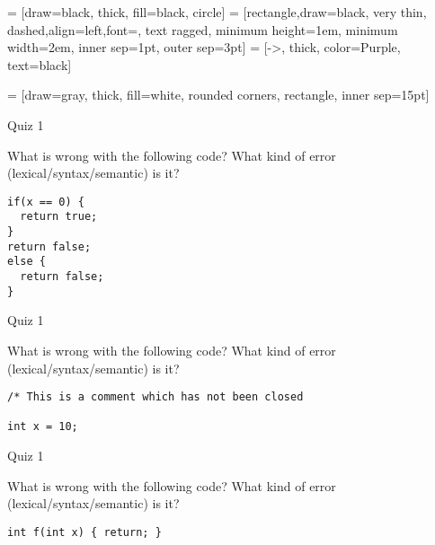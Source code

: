 \documentclass{beamer}
\begin{document}
 = [draw=black, thick, fill=black, circle]
 = [rectangle,draw=black, very thin, dashed,align=left,font=\scriptsize, text ragged, minimum height=1em, minimum width=2em, inner sep=1pt, outer sep=3pt]
 = [->, thick, color=Purple, text=black]



\newcommand\Mstrut[1]{\rule{0pt}{#1cm}}


 = [draw=gray, thick, fill=white, rounded corners, rectangle, inner sep=15pt]

\begin{frame}[fragile]{Quiz 1}


What is wrong with the following code? What kind of error (lexical/syntax/semantic) is it?
\begin{lstlisting}[style=javacode]
if(x == 0) {
  return true;
}
return false;
else {
  return false;
}
\end{lstlisting}
\end{frame}

\begin{frame}[fragile]{Quiz 1}

What is wrong with the following code? What kind of error (lexical/syntax/semantic) is it?
\begin{lstlisting}[style=javacode]
/* This is a comment which has not been closed

int x = 10;
\end{lstlisting}
\end{frame}

\begin{frame}[fragile]{Quiz 1}


What is wrong with the following code? What kind of error (lexical/syntax/semantic) is it?\begin{lstlisting}[style=javacode]
int f(int x) { return; }
\end{lstlisting}
\end{frame}
\end{document}
